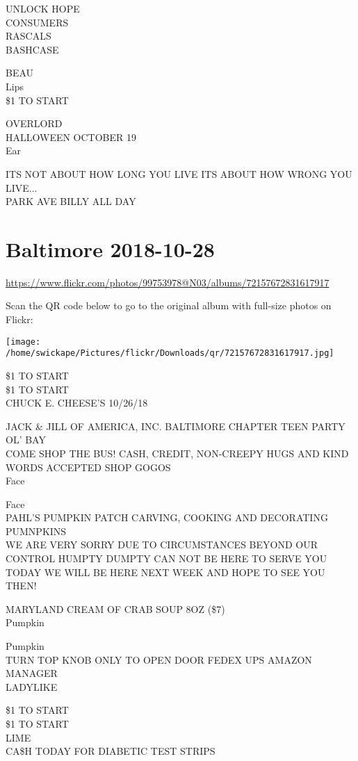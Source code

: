 \documentclass[10pt,letterpaper]{article}
\begin{document}
UNLOCK HOPE\\
CONSUMERS\\
RASCALS\\
BASHCASE

BEAU\\
Lips\\
\$1 TO START

OVERLORD\\
HALLOWEEN OCTOBER 19\\
Ear

ITS NOT ABOUT HOW LONG YOU LIVE ITS ABOUT HOW WRONG YOU LIVE...\\
PARK AVE BILLY ALL DAY


\section*{Baltimore 2018-10-28}

\url{https://www.flickr.com/photos/99753978@N03/albums/72157672831617917}

Scan the QR code below to go to the original album with full-size photos on Flickr:

\texttt{[image: /home/swickape/Pictures/flickr/Downloads/qr/72157672831617917.jpg]}


\$1 TO START\\
\$1 TO START\\
CHUCK E. CHEESE'S 10/26/18

JACK \& JILL OF AMERICA, INC. BALTIMORE CHAPTER TEEN PARTY\\
OL' BAY\\
COME SHOP THE BUS!  CASH, CREDIT, NON{-}CREEPY HUGS AND KIND WORDS ACCEPTED SHOP GOGOS\\
Face

Face\\
PAHL'S PUMPKIN PATCH CARVING, COOKING AND DECORATING PUMNPKINS\\
WE ARE VERY SORRY DUE TO CIRCUMSTANCES BEYOND OUR CONTROL HUMPTY DUMPTY CAN NOT BE HERE TO SERVE YOU TODAY WE WILL BE HERE NEXT WEEK AND HOPE TO SEE YOU THEN!

MARYLAND CREAM OF CRAB SOUP 8OZ (\$7)\\
Pumpkin

Pumpkin\\
TURN TOP KNOB ONLY TO OPEN DOOR FEDEX UPS AMAZON MANAGER\\
LADYLIKE

\$1 TO START\\
\$1 TO START\\
LIME\\
CA\$H TODAY FOR DIABETIC TEST STRIPS
\end{document}

